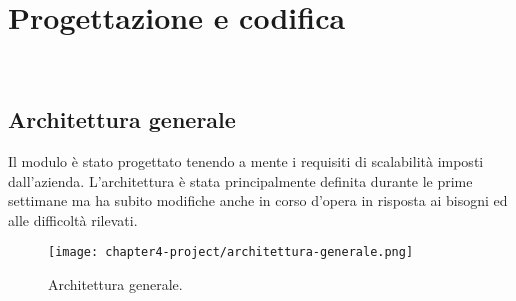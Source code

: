 
\chapter{Progettazione e codifica}
\label{cap:progettazione-codifica}

\\

\section{Architettura generale}

Il modulo è stato progettato tenendo a mente i requisiti di scalabilità imposti dall'azienda. L'architettura è stata principalmente definita durante le prime settimane ma ha subito modifiche anche in corso d'opera in risposta ai bisogni ed alle difficoltà rilevati.


\begin{figure}[!h] 
    \centering 
    \texttt{[image: chapter4-project/architettura-generale.png]} 
    \caption{Architettura generale.}
\end{figure}